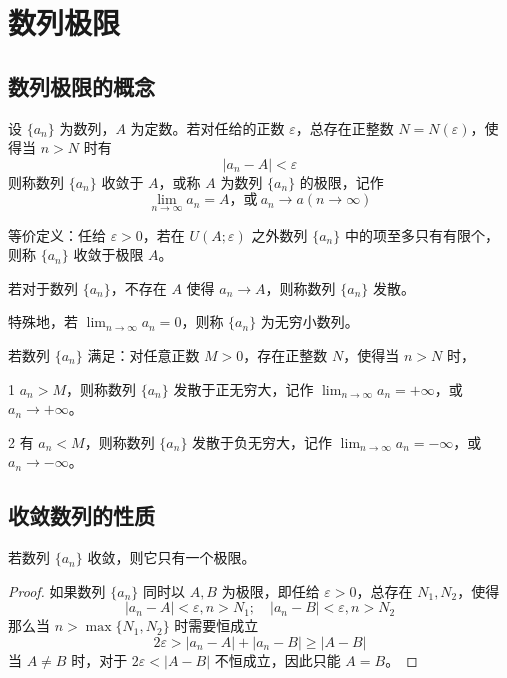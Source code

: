\chapter{数列极限}

\section{数列极限的概念}

\begin{definition}
	设 $\{a_n\}$ 为数列，$A$ 为定数。若对任给的正数 $\varepsilon$，总存在正整数 $N=N(\varepsilon)$，使得当 $n>N$ 时有
	$$|a_n - A| < \varepsilon$$
	则称数列 $\{a_n\}$ 收敛于 $A$，或称 $A$ 为数列 $\{a_n\}$ 的极限，记作
	$$\displaystyle\lim_{n\to \infty} a_n = A \text{，或}\ a_n \to a(n \to \infty)$$
\end{definition}

等价定义：任给 $\varepsilon > 0$，若在 $U(A;\varepsilon)$ 之外数列 $\{a_n\}$ 中的项至多只有有限个，则称 $\{a_n\}$ 收敛于极限 $A$。

若对于数列 $\{a_n\}$，不存在 $A$ 使得 $a_n\to A$，则称数列 $\{a_n\}$ 发散。

特殊地，若 $\displaystyle\lim_{n\to \infty} a_n = 0$，则称 $\{a_n\}$ 为无穷小数列。

\begin{definition}[无穷大数列]
	若数列 $\{a_n\}$ 满足：对任意正数 $M>0$，存在正整数 $N$，使得当 $n>N$ 时，

	\num{1} $a_n>M$，则称数列 $\{a_n\}$ 发散于正无穷大，记作 $\displaystyle\lim_{n\to \infty} a_n = +\infty$，或 $a_n \to +\infty$。

	\num{2} 有 $a_n<M$，则称数列 $\{a_n\}$ 发散于负无穷大，记作 $\displaystyle\lim_{n\to \infty} a_n = -\infty$，或 $a_n \to -\infty$。
\end{definition}

\section{收敛数列的性质}

\begin{theorem}[唯一性]
	若数列 $\{a_n\}$ 收敛，则它只有一个极限。
\end{theorem}

\begin{proof}
	如果数列 $\{a_n\}$ 同时以 $A,B$ 为极限，即任给 $\varepsilon>0$，总存在 $N_1,N_2$，使得
	$$|a_n-A|<\varepsilon,n>N_1;\quad |a_n-B|<\varepsilon,n>N_2$$
	那么当 $n>\max\{N_1,N_2\}$ 时需要恒成立
	$$2\varepsilon > |a_n-A|+|a_n-B| \geqslant |A-B|$$
	当 $A\ne B$ 时，对于 $2\varepsilon <|A-B|$ 不恒成立，因此只能 $A=B$。
\end{proof}

